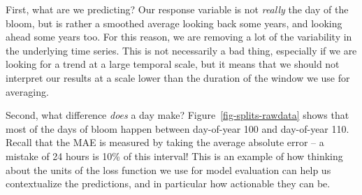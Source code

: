 \documentclass[
  letterpaper,
]{scrbook}
\begin{document}
\begin{table}

\caption{\label{tbl-splits-performance-summary}TODO}


\end{table}%

First, what are we predicting? Our response variable is not
\emph{really} the day of the bloom, but is rather a smoothed average
looking back some years, and looking ahead some years too. For this
reason, we are removing a lot of the variability in the underlying time
series. This is not necessarily a bad thing, especially if we are
looking for a trend at a large temporal scale, but it means that we
should not interpret our results at a scale lower than the duration of
the window we use for averaging.

Second, what difference \emph{does} a day make?
Figure~\ref{fig-splits-rawdata} shows that most of the days of bloom
happen between day-of-year 100 and day-of-year 110. Recall that the MAE
is measured by taking the average absolute error -- a mistake of 24
hours is 10\% of this interval! This is an example of how thinking about
the units of the loss function we use for model evaluation can help us
contextualize the predictions, and in particular how actionable they can
be.
\end{document}
